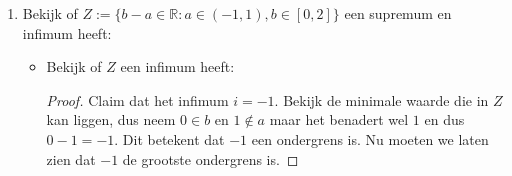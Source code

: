 \documentclass{article}
\newcommand{\f}[2]{\frac{#1}{#2}}
\newcommand{\tx}[1]{\text{#1}}
\newcommand{\R}{\mathbb{R}}
\begin{document}
\begin{enumerate}[label=\arabic*]
\begin{enumerate}[label=\alph*)]
\begin{enumerate}
\begin{itemize}
\begin{proof}
                                                      Nu moeten we nog laten zien dat het de grootste ondergrens is.
                                                      Voor alle $\epsilon > 0$, bestaat er een $x \in Y$ zodanig dat:
                                                      \[\epsilon + \underbrace{1}_{\tx{Onze claim } i = 1} > x \]
                                                      neem $x = 1 + \f{1}{n+1}$, dan:
                                                      \[\epsilon + 1 > \f{1}{n+1} + 1\]
                                                      We kunnen epsilon willekeurig klein maken en met name $\epsilon > \f{1}{n+1}$,
                                                      en dus volgt dat $i = 1$ inderdaad het infimum is.
                                                \end{proof}
                                          \item Bekijk of $Y$ een supremum heeft:
                                                \begin{proof}
                                                      Claim dat het supremum $s = 2$.
                                                      Bekijk $x \in 1 + \f{1}{n+1}$, we kunnen dit zien als
                                                      een strikt dalende functie en dus geldt voor $n=0$, dat
                                                      dit de grootste waarde is voor $1 + \f{1}{n+1}$.
                                                      En dus $1 + \f{1}{0+1} = 2$. Dit betekent dus dat $2$ het maximum van $Y$ is en dus
                                                      automatisch het supremum.
                                                \end{proof}
                                    \end{itemize}
                              \item Bekijk of $Z:= \{b-a \in \R : a\in (-1, 1), b \in [0, 2]\}$ een supremum en infimum heeft:
                                    \begin{itemize}
                                          \item Bekijk of $Z$ een infimum heeft:
                                                \begin{proof}
                                                      Claim dat het infimum $i = -1$.
                                                      Bekijk de minimale waarde die in $Z$ kan liggen, dus neem
                                                      $0 \in b$ en $1 \notin a$ maar het benadert wel $1$ en dus $0 - 1 = -1$.
                                                      Dit betekent dat $-1$ een ondergrens is.
                                                      Nu moeten we laten zien dat $-1$ de grootste ondergrens is.


\end{proof}
\end{itemize}
\end{enumerate}
\end{enumerate}
\end{enumerate}
\end{document}
